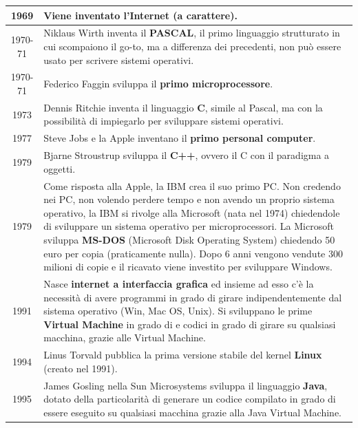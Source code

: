 \documentclass{article}
\begin{document}
\begin{center}
\begin{tabularx}{\textwidth}{c X}
		1969
		& Viene inventato l'\textbf{Internet} (a carattere). \\
		\midrule

		1970-71
		& Niklaus Wirth inventa il \textbf{PASCAL}, il primo linguaggio strutturato in cui scompaiono il go-to, ma a
		differenza dei precedenti, non può essere usato per scrivere sistemi operativi. \\
		\midrule

		1970-71
		& Federico Faggin sviluppa il \textbf{primo microprocessore}. \\
		\midrule
		
		1973
		& Dennis Ritchie inventa il linguaggio \textbf{C}, simile al Pascal, ma con la possibilità di impiegarlo per
		sviluppare sistemi operativi. \\
		\midrule

		1977
		& Steve Jobs e la Apple inventano il \textbf{primo personal computer}. \\
		\midrule
		
		1979
		& Bjarne Stroustrup sviluppa il \textbf{C++}, ovvero il C con il paradigma a oggetti. \\
		\midrule
		
		1979
		& Come risposta alla Apple, la IBM crea il suo primo PC. Non credendo nei PC, non volendo perdere tempo e non
		avendo un proprio sistema operativo, la IBM si rivolge alla Microsoft (nata nel 1974) chiedendole di sviluppare
		un sistema operativo per microprocessori. La Microsoft sviluppa \textbf{MS-DOS} (Microsoft Disk Operating System)
		chiedendo 50 euro per copia (praticamente nulla). Dopo 6 anni vengono vendute 300 milioni di copie e il ricavato
		viene investito per sviluppare Windows. \\
		\midrule

		1991
		& Nasce \textbf{internet a interfaccia grafica} ed insieme ad esso c'è la necessità di avere programmi in grado di girare
		indipendentemente dal sistema operativo (Win, Mac OS, Unix). Si sviluppano le prime \textbf{Virtual Machine} in grado di 
		e codici in grado di girare su qualsiasi macchina, grazie alle Virtual Machine. \\
		\midrule
		
		1994
		& Linus Torvald pubblica la prima versione stabile del kernel \textbf{Linux} (creato nel 1991). \\
		\midrule
		
		1995
		& James Gosling nella Sun Microsystems sviluppa il linguaggio \textbf{Java}, dotato della particolarità di generare un codice
		compilato in grado di essere eseguito su qualsiasi macchina grazie alla Java Virtual Machine.
	\end{tabularx}
\end{center}
\end{document}
